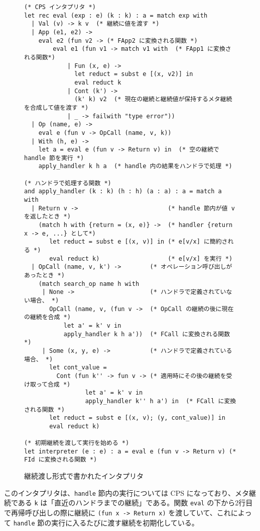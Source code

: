 \begin{figure}
\begin{verbatim}
(* CPS インタプリタ *)
let rec eval (exp : e) (k : k) : a = match exp with
  | Val (v) -> k v  (* 継続に値を渡す *)
  | App (e1, e2) ->
    eval e2 (fun v2 -> (* FApp2 に変換される関数 *)
        eval e1 (fun v1 -> match v1 with  (* FApp1 に変換される関数*)
            | Fun (x, e) ->
              let reduct = subst e [(x, v2)] in
              eval reduct k
            | Cont (k') ->
              (k' k) v2  (* 現在の継続と継続値が保持するメタ継続を合成して値を渡す *)
            | _ -> failwith "type error"))
  | Op (name, e) ->
    eval e (fun v -> OpCall (name, v, k))
  | With (h, e) ->
    let a = eval e (fun v -> Return v) in  (* 空の継続で handle 節を実行 *)
    apply_handler k h a  (* handle 内の結果をハンドラで処理 *)

(* ハンドラで処理する関数 *)
and apply_handler (k : k) (h : h) (a : a) : a = match a with
  | Return v ->                         (* handle 節内が値 v を返したとき *)
    (match h with {return = (x, e)} ->  (* handler {return x -> e, ...} として*)
       let reduct = subst e [(x, v)] in (* e[v/x] に簡約される *)
       eval reduct k)                   (* e[v/x] を実行 *)
  | OpCall (name, v, k') ->        (* オペレーション呼び出しがあったとき *)
    (match search_op name h with
     | None ->                     (* ハンドラで定義されていない場合、 *)
       OpCall (name, v, (fun v ->  (* OpCall の継続の後に現在の継続を合成 *)
           let a' = k' v in
           apply_handler k h a'))  (* FCall に変換される関数 *)
     | Some (x, y, e) ->           (* ハンドラで定義されている場合、 *)
       let cont_value =
         Cont (fun k'' -> fun v -> (* 適用時にその後の継続を受け取って合成 *)
                 let a' = k' v in
                 apply_handler k'' h a') in  (* FCall に変換される関数 *)
       let reduct = subst e [(x, v); (y, cont_value)] in
       eval reduct k)

(* 初期継続を渡して実行を始める *)
let interpreter (e : e) : a = eval e (fun v -> Return v) (* FId に変換される関数 *)
\end{verbatim}
\caption{継続渡し形式で書かれたインタプリタ}
\label{figure:1cps}
\end{figure}

このインタプリタは、\texttt{handle} 節内の実行については CPS になっており、メタ継続である \texttt{k} は「直近のハンドラまでの継続」である。関数 \texttt{eval} の下から2行目で再帰呼び出しの際に継続に \texttt{(fun x -> Return x)} を渡していて、これによって \texttt{handle} 節の実行に入るたびに渡す継続を初期化している。

